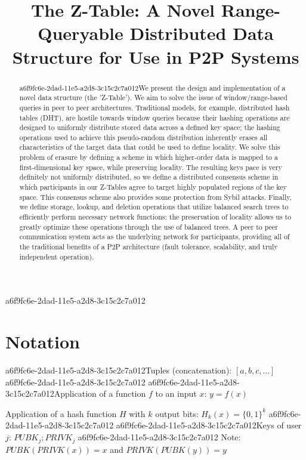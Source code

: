 \documentclass[12pt]{article}
\title{The Z-Table: A Novel Range-Queryable Distributed Data Structure for Use in P2P Systems}
\begin{document}
\maketitle

\begin{abstract}
a6f9fc6e-2dad-11e5-a2d8-3c15c2c7a012We present the design and implementation of a novel data structure (the 'Z-Table'). We aim to solve the issue of window/range-based queries in peer to peer architectures. Traditional models, for example,  distributed hash tables (DHT), are hostile towards window queries because their hashing operations are designed to uniformly distribute stored data across a defined key space; the hashing operations used to achieve this pseudo-random distribution inherently erases all characteristics of the target data that could be used to define locality. We solve this problem of erasure by defining a scheme in which higher-order data is mapped to a first-dimensional key space, while preserving locality. The resulting keys pace is very definitely not uniformly distributed, so we define a distributed consensus scheme in which participants in our Z-Tables agree to target highly populated regions of the key space. This consensus scheme also provides some protection from Sybil attacks. Finally, we define storage, lookup, and deletion operations that utilize balanced search trees to efficiently perform necessary network functions; the preservation of locality allows us to greatly optimize these operations through the use of balanced trees. A peer to peer communication system acts as the underlying network for participants, providing all of the traditional benefits of a P2P architecture (fault tolerance, scalability, and truly independent operation).
\end{abstract}
a6f9fc6e-2dad-11e5-a2d8-3c15c2c7a012
\section{Notation}

a6f9fc6e-2dad-11e5-a2d8-3c15c2c7a012Tuples (concatenation): $[a,b,c,...]$
a6f9fc6e-2dad-11e5-a2d8-3c15c2c7a012
a6f9fc6e-2dad-11e5-a2d8-3c15c2c7a012Application of a function $f$ to an input $x$: $y=f(x)$

Application of a hash function $H$ with $k$ output bits: $H_{k}(x) = \{0,1\}^k$
a6f9fc6e-2dad-11e5-a2d8-3c15c2c7a012
a6f9fc6e-2dad-11e5-a2d8-3c15c2c7a012Keys of user $j$: $ PUBK_j; PRIVK_j $
a6f9fc6e-2dad-11e5-a2d8-3c15c2c7a012
Note: $PUBK(PRIVK(x)) = x$ and $PRIVK(PUBK(y)) = y$~
\end{document}
